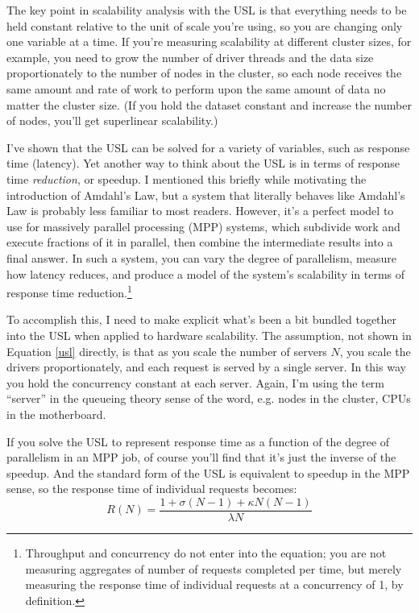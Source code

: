 \documentclass{vivid_layout}
\begin{document}
The key point in scalability analysis with the USL is that everything needs to be held
constant relative to the unit of scale you're using, so you are changing only
one variable at a time. If you're measuring scalability at different cluster
sizes, for example, you need to grow the number of driver threads and the data
size proportionately to the number of nodes in the cluster, so each node
receives the same amount and rate of work to perform upon the same amount of
data no matter the cluster size. (If you hold the dataset constant and increase
the number of nodes, you'll get superlinear scalability.)

I've shown that the USL can be solved for a variety of variables, such as
response time (latency). Yet another way to think about the USL is in terms of
response time {\itshape reduction}, or speedup. I mentioned this briefly while
motivating the introduction of Amdahl's Law, but a system that literally behaves
like Amdahl's Law is probably less familiar to most readers.  However, it's a
perfect model to use for massively parallel processing (MPP) systems, which
subdivide work and execute fractions of it in parallel, then combine the
intermediate results into a final answer. In such a system, you can vary the
degree of parallelism, measure how latency reduces, and produce a model of the
system's scalability in terms of response time reduction.\footnote{Throughput
and concurrency do not enter into the equation; you are not measuring aggregates
of number of requests completed per time, but merely measuring the response time
of individual requests at a concurrency of 1, by definition.}

To accomplish this, I need to make explicit what's been a bit bundled together
into the USL when applied to hardware scalability. The assumption, not shown in
Equation \ref{usl} directly, is that as you scale the number of servers $N$, you
scale the drivers proportionately, and each request is served by a single
server. In this way you hold the concurrency constant at each server. Again, I'm
using the term ``server'' in the queueing theory sense of the word, e.g. nodes
in the cluster, CPUs in the motherboard.

If you solve the USL to represent response time as a function of the degree of
parallelism in an MPP job, of course you'll find that it's just the inverse of
the speedup. And the standard form of the USL is equivalent to speedup in the
MPP sense, so the response time of individual requests becomes:
\begin{equation}
R(N) = \frac{1 + \sigma (N-1) + \kappa N (N-1)}{\lambda N}
\label{usl_speedup}
\end{equation}
\end{document}
